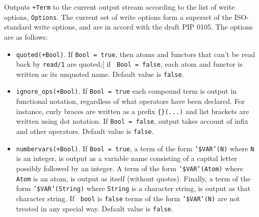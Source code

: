 \begin{description}
%
Outputs {\tt +Term} to the current output stream according to the list
of write options, {\tt Options}.  The current set of write options
form a superset of the ISO-standard write options, and are in accord
with the draft PIP 0105.  The options are as follows:
%
\begin{itemize}
%
\item {\tt quoted(+Bool)}.  If {\tt Bool = true}, then atoms and
  functors that can't be read back by {\tt read/1} are quoted;[ if {\tt
    Bool = false}, each atom and functor is written as its unquoted
  name. Default value is {\tt false}.
%
\item {\tt ignore\_ops(+Bool)}. If {\tt Bool = true} each compound
  term is output in functional notation, regardless of what operators
  have been declared.  For instance, curly braces are written as a
  prefix {\tt \{\}(...)} and list brackets are written using dot
  notation.  If {\tt Bool = false}, output takes account of infix and
  other operators.  Default value is {\tt false}.
%
 \item {\tt numbervars(+Bool)}.  If {\tt Bool = true}, a term of the
   form {\tt '\$VAR'(N)} where {\tt N} is an integer, is output as a
   variable name consisting of a capital letter possibly followed by
   an integer.  A term of the form {\tt '\$VAR'(Atom)} where {\tt
     Atom} is an atom, is output as itself (without quotes).  Finally,
   a term of the form {\tt '\$VAR'(String)} where {\tt String} is a
   character string, is output as that character string.  If {\tt
     bool} is {\tt false} terms of the form {\tt '\$VAR'(N)} are not
   treated in any special way.  Default value is {\tt false}.
%
%
\end{itemize}
\end{description}
